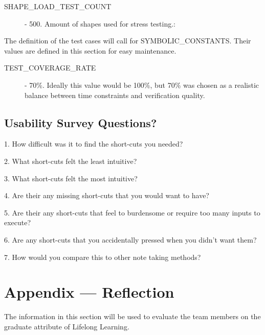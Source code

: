 \documentclass[12pt, titlepage]{article}
\begin{document}
\begin{description}
  \item[SHAPE\_LOAD\_TEST\_COUNT] - 500.  Amount of shapes used for stress testing.: 
\end{description}


The definition of the test cases will call for SYMBOLIC\_CONSTANTS.
Their values are defined in this section for easy maintenance.\\

\begin{description}
  \item[TEST\_COVERAGE\_RATE] - 70\%. Ideally this value would be 100\%, but 70\% was chosen as a realistic balance between time constraints and verification quality.
\end{description}

\subsection{Usability Survey Questions?}


1. How difficult was it to find the short-cuts you needed?

2. What short-cuts felt the least intuitive? 

3. What short-cuts felt the most intuitive? 

4. Are their any missing short-cuts that you would want to have?

5. Are their any short-cuts that feel to burdensome or require too many inputs to execute?

6. Are any short-cuts that you accidentally pressed when you didn't want them?

7. How would you compare this to other note taking methods?

\newpage{}
\section*{Appendix --- Reflection}


The information in this section will be used to evaluate the team members on the
graduate attribute of Lifelong Learning.


\end{document}
